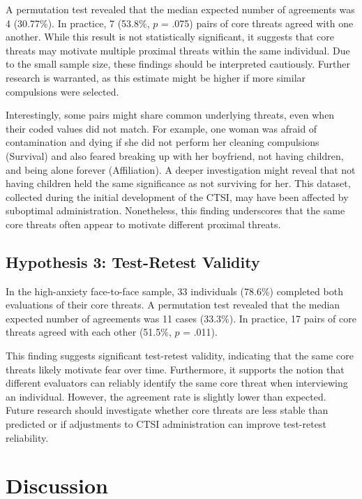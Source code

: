 \documentclass[
  man,floatsintext]{apa7}
\begin{document}
A permutation test revealed that the median expected number of agreements was 4 (30.77\%).
In practice, 7 (53.8\%, \(p\) = .075) pairs of core threats agreed with one another.
While this result is not statistically significant, it suggests that core threats may motivate multiple proximal threats within the same individual.
Due to the small sample size, these findings should be interpreted cautiously.
Further research is warranted, as this estimate might be higher if more similar compulsions were selected.

Interestingly, some pairs might share common underlying threats, even when their coded values did not match.
For example, one woman was afraid of contamination and dying if she did not perform her cleaning compulsions (Survival) and also feared breaking up with her boyfriend, not having children, and being alone forever (Affiliation).
A deeper investigation might reveal that not having children held the same significance as not surviving for her.
This dataset, collected during the initial development of the CTSI, may have been affected by suboptimal administration.
Nonetheless, this finding underscores that the same core threats often appear to motivate different proximal threats.

\subsection{Hypothesis 3: Test-Retest Validity}\label{hypothesis-3-test-retest-validity}

In the high-anxiety face-to-face sample, 33 individuals (78.6\%) completed both evaluations of their core threats.
A permutation test revealed that the median expected number of agreements was 11 cases (33.3\%).
In practice, 17 pairs of core threats agreed with each other (51.5\%, \(p\) = .011).

This finding suggests significant test-retest validity, indicating that the same core threats likely motivate fear over time.
Furthermore, it supports the notion that different evaluators can reliably identify the same core threat when interviewing an individual.
However, the agreement rate is slightly lower than expected.
Future research should investigate whether core threats are less stable than predicted or if adjustments to CTSI administration can improve test-retest reliability.

\section{Discussion}\label{discussion}
\end{document}
